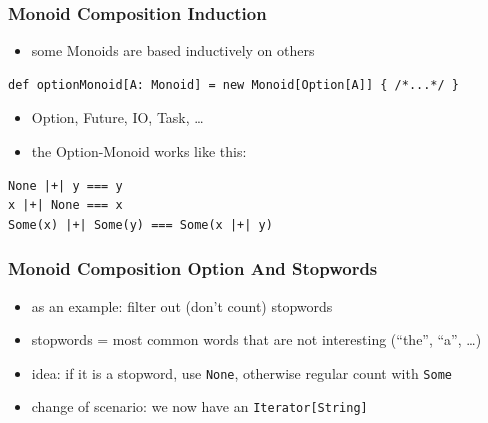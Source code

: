\documentclass[aspectratio=169]{beamer}
\begin{document}
\begin{frame}[fragile]
  \frametitle{Monoid Composition \textemdash{} Induction}
  \begin{itemize}
  \item some Monoids are based inductively on others
  \end{itemize}
  \begin{verbatim}
def optionMonoid[A: Monoid] = new Monoid[Option[A]] { /*...*/ }
  \end{verbatim}
  \begin{itemize}
  \item Option, Future, IO, Task, \ldots{}
  \item the Option-Monoid works like this:
  \end{itemize}
  \begin{center}
    \vspace{5mm}
    \begin{verbatim}
None |+| y === y
x |+| None === x
Some(x) |+| Some(y) === Some(x |+| y)
    \end{verbatim}
  \end{center}
\end{frame}

\begin{frame}[fragile]
  \frametitle{Monoid Composition \textemdash{} Option And Stopwords}
  \begin{itemize}
  \item as an example: filter out (don't count) stopwords
  \item stopwords = most common words that are not interesting
    (``the'', ``a'', \ldots{})
  \item idea: if it is a stopword, use \texttt{None}, otherwise
    regular count with \texttt{Some}
  \item change of scenario: we now have an \texttt{Iterator[String]}
  \end{itemize}
\end{frame}
\end{document}
